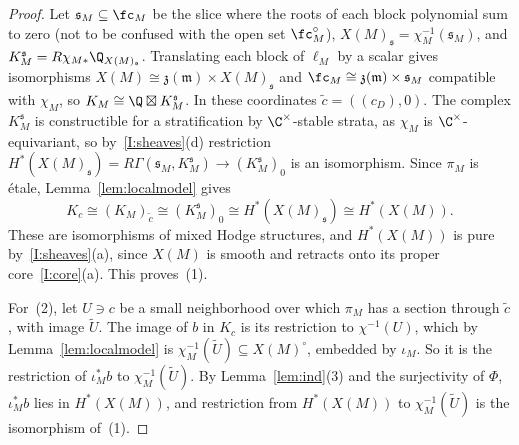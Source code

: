 \documentclass[11pt]{amsart}
\begin{document}
\begin{proof}
Let $\mathfrak s_M\subseteq\fc_M$ be the slice where the roots of each block
polynomial sum to zero (not to be confused with the open set $\fc^\circ_M$), $X(M)_{\mathfrak s}=\chi_M^{-1}(\mathfrak s_M)$, and
$K^{\mathfrak s}_M=R\chi_{M*}\Q_{X(M)_{\mathfrak s}}$.  Translating each block of $\ell_M$ by a scalar
gives isomorphisms $X(M)\cong\mathfrak z(\mathfrak m)\times X(M)_{\mathfrak s}$ and
$\fc_M\cong\mathfrak z(\mathfrak m)\times\mathfrak s_M$ compatible with $\chi_M$, so
$K_M\cong\Q\boxtimes K^{\mathfrak s}_M$.  In these coordinates $\tilde c=((c_D),0)$.  The
complex $K^{\mathfrak s}_M$ is constructible for a stratification by
$\C^\times$-stable strata, as $\chi_M$ is $\C^\times$-equivariant, so by~\ref{I:sheaves}(d) restriction
$H^*(X(M)_{\mathfrak s})=R\Gamma(\mathfrak s_M,K^{\mathfrak s}_M)\to(K^{\mathfrak s}_M)_0$ is an isomorphism.  Since
$\pi_M$ is \'etale, Lemma~\ref{lem:localmodel} gives
\[
 K_c\cong(K_M)_{\tilde c}\cong(K^{\mathfrak s}_M)_0\cong H^*(X(M)_{\mathfrak s})\cong H^*(X(M)).
\]
These are isomorphisms of mixed Hodge structures, and $H^*(X(M))$ is pure
by~\ref{I:sheaves}(a), since $X(M)$ is smooth and retracts onto its proper
core~\ref{I:core}(a).  This proves~(1).

For~(2), let $U\ni c$ be a small neighborhood over which $\pi_M$ has a section
through $\tilde c$, with image $\tilde U$.  The image of $b$ in $K_c$ is its
restriction to $\chi^{-1}(U)$, which by Lemma~\ref{lem:localmodel} is
$\chi_M^{-1}(\tilde U)\subseteq X(M)^\circ$, embedded by $\iota_M$.  So it is
the restriction of $\iota_M^*b$ to $\chi_M^{-1}(\tilde U)$.  By
Lemma~\ref{lem:ind}(3) and the surjectivity of $\Phi$, $\iota_M^*b$ lies in
$H^*(X(M))$, and restriction from $H^*(X(M))$ to $\chi_M^{-1}(\tilde U)$ is the
isomorphism of~(1).
\end{proof}
\end{document}
